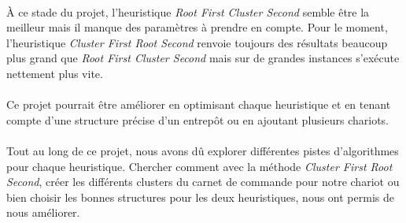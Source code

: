 \documentclass[twoside,UTF8]{EPURapport}
\begin{document}
\paragraph{}
\`A ce stade du projet, l'heuristique \textit{Root First Cluster Second} semble être la meilleur mais il manque des paramètres à prendre en compte. Pour le moment, l'heuristique \textit{Cluster First Root Second} renvoie toujours des résultats beaucoup plus grand que \textit{Root First Cluster Second} mais sur de grandes instances s'exécute nettement plus vite.

\paragraph{}
Ce projet pourrait être améliorer en optimisant chaque heuristique et en tenant compte d'une structure précise d'un entrepôt ou en ajoutant plusieurs chariots. 

\paragraph{}
Tout au long de ce projet, nous avons dû explorer différentes pistes d'algorithmes pour chaque heuristique. Chercher comment avec la méthode \textit{Cluster First Root Second}, créer les différents clusters du carnet de commande pour notre chariot ou bien choisir les bonnes structures pour les deux heuristiques, nous ont permis de nous améliorer. 

\end{document}
